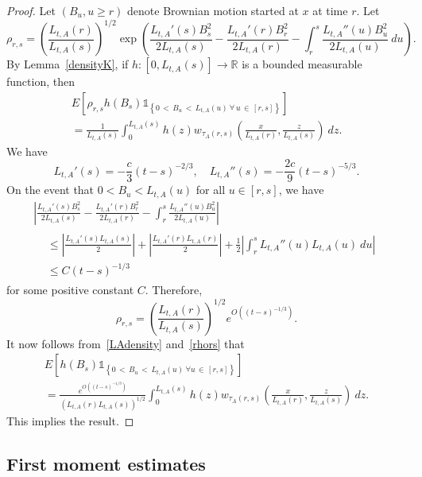\documentclass[AHL,Unicode,longabstracts,published]{cedram}
\newcommand*\R{\mathbb{R}}
\newcommand{\1} {\mathds{1}}
\let\oldforall\forall
\renewcommand*{\forall}{\mathrel{\oldforall}}
\begin{document}
\begin{proof}
Let $(B_u, u \geq r)$ denote Brownian motion started at $x$ at time $r$. Let
\[
\rho_{r,s} = \left(\frac{L_{t,A}(r)}{L_{t,A}(s)} \right)^{1/2} \exp \left(\frac{L_{t,A}'(s) B_s^2}{2L_{t,A}(s)} - \frac{L_{t,A}'(r)B_r^2}{2L_{t,A}(r)} - \int_r^s \frac{L_{t,A}''(u)B_u^2}{2L_{t,A}(u)} \: du \right).
\]
By Lemma~\ref{densityK}, if $h: [0, L_{t,A}(s)] \rightarrow \R$ is a bounded measurable function, then
\begin{multline}\label{LAdensity}
E \left[\rho_{r,s} h(B_s) \1_{\left\{0\,<\,B_u\,<\, L_{t,A}(u) \: \forall\,u\,\in\,[r, s]\right\}} \right]\\
= \frac{1}{L_{t,A}(s)} \int_0^{L_{t,A}(s)} h(z) w_{\tau_A(r,s)}\left(\frac{x}{L_{t,A}(r)}, \frac{z}{L_{t,A}(s)} \right) \: dz.
\end{multline}
We have
\[
L_{t,A}'(s) = -\frac{c}{3} (t - s)^{-2/3}, \quad L_{t,A}''(s) = -\frac{2c}{9} (t - s)^{-5/3}.
\]
On the event that $0 < B_u < L_{t,A}(u)$ for all $u \in [r, s]$, we have
\begin{multline*}
\left| \frac{L_{t,A}'(s) B_s^2}{2L_{t,A}(s)} - \frac{L_{t,A}'(r)B_r^2}{2L_{t,A}(r)} - \int_r^s \frac{L_{t,A}''(u) B_u^2}{2L_{t,A}(u)} \right| \\
\begin{aligned}
&\leq \left| \frac{L_{t,A}'(s) L_{t,A}(s)}{2} \right| + \left| \frac{L_{t,A}'(r) L_{t,A}(r)}{2} \right| + \frac{1}{2} \left| \int_r^s L_{t,A}''(u) L_{t,A}(u) \: du \right| \\
&\leq C (t - s)^{-1/3}
\end{aligned}
\end{multline*}
for some positive constant $C$. Therefore,
\begin{equation}\label{rhors}
\rho_{r,s} = \left(\frac{L_{t,A}(r)}{L_{t,A}(s)} \right)^{1/2}e^{O((t-s)^{-1/3})}.
\end{equation}
It now follows from~\eqref{LAdensity} and~\eqref{rhors} that
\begin{multline*}
E \left[h(B_s) \1_{\left\{0\,<\,B_u\,<\,L_{t,A}(u) \: \forall u\,\in\,[r,s]\right\}} \right]\\
= \frac{e^{O\left((t-s)^{-1/3}\right)}}{\left(L_{t,A}(r) L_{t,A}(s)\right)^{1/2}} \int_0^{L_{t,A}(s)} h(z) w_{\tau_A(r,s)} \left(\frac{x}{L_{t,A}(r)}, \frac{z}{L_{t,A}(s)} \right) \: dz.
\end{multline*}
This implies the result.
\end{proof}

\subsection{First moment estimates}\label{sec:first_moment_estimates}
\end{document}
